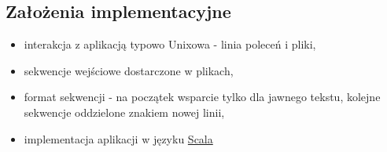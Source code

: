 \documentclass[12pt, a4paper]{article}
\begin{document}
\subsection{Założenia implementacyjne}
\begin{itemize}
\item interakcja z aplikacją typowo Unixowa - linia poleceń i pliki,
\item sekwencje wejściowe dostarczone w plikach,
\item format sekwencji - na początek wsparcie tylko dla jawnego tekstu, kolejne sekwencje oddzielone znakiem nowej linii,
\item implementacja aplikacji w języku \href{http://www.scala-lang.org/}{Scala}
\end{itemize}
\end{document}
